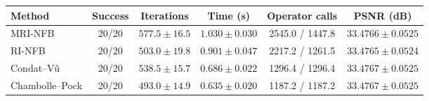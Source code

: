 \begin{tabular}{lccccc}\hline
Method & Success & Iterations & Time (s) & Operator calls & PSNR (dB) \\
\hline
MRI-NFB & 20/20 & $577.5 \pm 16.5$ & $1.030 \pm 0.030$ & 2545.0 / 1447.8 & $33.4766 \pm 0.0525$ \\
RI-NFB & 20/20 & $503.0 \pm 19.8$ & $0.901 \pm 0.047$ & 2217.2 / 1261.5 & $33.4765 \pm 0.0524$ \\
Condat--V{\~u} & 20/20 & $538.5 \pm 15.7$ & $0.686 \pm 0.022$ & 1296.4 / 1296.4 & $33.4767 \pm 0.0525$ \\
Chambolle--Pock & 20/20 & $493.0 \pm 14.9$ & $0.635 \pm 0.020$ & 1187.2 / 1187.2 & $33.4767 \pm 0.0525$ \\
\hline\end{tabular}
